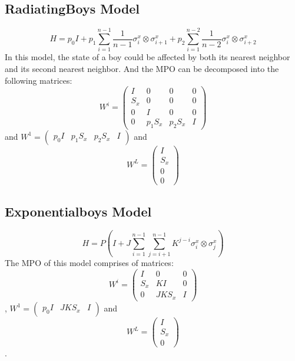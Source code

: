 \documentclass[english]{article}
\begin{document}
\subsection{RadiatingBoys Model}
\begin{displaymath}
H=p_0 I + p_1 \sum_{i=1}^{n-1}\frac{1}{n-1}\sigma_i^x\otimes\sigma_{i+1}^x + p_2 \sum_{i=1}^{n-2}\frac{1}{n-2}\sigma_i^x\otimes\sigma_{i+2}^x
\end{displaymath}
In this model, the state of a boy could be affected by both its nearest neighbor and its second nearest neighbor. And the MPO can be decomposed into the following matrices:
$$
W^{i}=
\begin{pmatrix}
I & 0 & 0 & 0 \\
S_x & 0 & 0 & 0 \\
0 & I & 0 & 0 \\
0 & p_1 S_x & p_2 S_x & I
\end{pmatrix}
$$
and $W^1=\begin{pmatrix}p_0 I & p_1 S_x & p_2 S_x & I\end{pmatrix}$ and 
$$W^L=
\begin{pmatrix}
I \\ S_x \\ 0 \\0
\end{pmatrix}$$


\subsection{Exponentialboys Model}
\begin{displaymath}
H = P (I + J \sum_{i=1}^{n-1} \sum_{j=i+1}^{n-1} K^{j-i}\sigma_i^x\otimes\sigma_j^x)
\end{displaymath}
The MPO of this model comprises of matrices:
$$W^{i}=
\begin{pmatrix}
I & 0 & 0 \\
S_x & K I & 0 \\
0 & J K S_x & I
\end{pmatrix}
$$,
$W^1=\begin{pmatrix}p_0 I & J K S_x & I\end{pmatrix}$ and 
$$W^L=
\begin{pmatrix}
I \\ S_x \\0
\end{pmatrix}$$.
\end{document}
